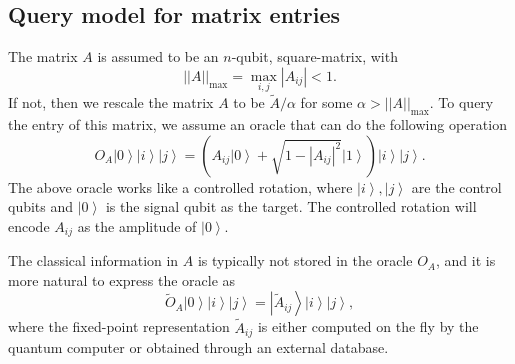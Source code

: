 \documentclass[11pt]{article}
\newcommand{\ket}[1]{\left|#1\right\rangle}
\begin{document}
\subsection{Query model for matrix entries}
The matrix $A$ is assumed to be an $n$-qubit, square-matrix, with 
\begin{equation}
    ||A||_{\text{max}} = \max_{i,j}|A_{ij}| < 1.
\end{equation}
If not, then we rescale the matrix $A$ to be $\tilde{A}/\alpha$ for some $\alpha > ||A||_{\text{max}}$. To query the entry of this matrix, we assume an oracle that can do the following operation 
\begin{equation}
    O_A\ket{0}\ket{i}\ket{j} = (A_{ij}\ket{0} + \sqrt{1 - |A_{ij}|^2}\ket{1})\ket{i}\ket{j}.
\end{equation}
The above oracle works like a controlled rotation, where $\ket{i},\ket{j}$ are the control qubits and $\ket{0}$ is the signal qubit as the target. The controlled rotation will encode $A_{ij}$ as the amplitude of $\ket{0}$.

The classical information in $A$ is typically not stored in the oracle $O_A$, and it is more natural to express the oracle as 
\begin{equation}
    \tilde{O}_A\ket{0}\ket{i}\ket{j}= \ket{\tilde{A}_{ij}}\ket{i}\ket{j},
\end{equation}
where the fixed-point representation $\tilde{A}_{ij}$ is either computed on the fly by the quantum computer or obtained through an external database. 
\end{document}
